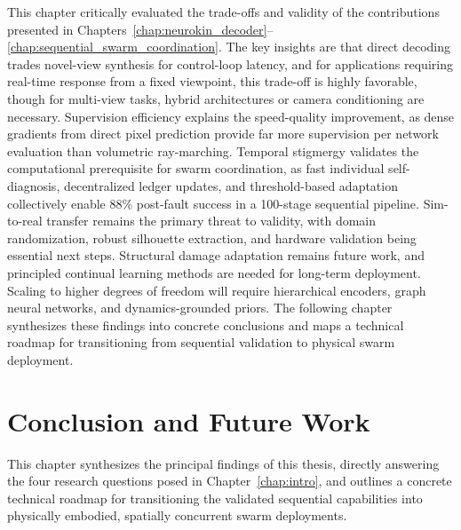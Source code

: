 \documentclass[12pt,a4paper,oneside]{report}
\begin{document}
This chapter critically evaluated the trade-offs and validity of the contributions presented in Chapters~\ref{chap:neurokin_decoder}--\ref{chap:sequential_swarm_coordination}. The key insights are that direct decoding trades novel-view synthesis for control-loop latency, and for applications requiring real-time response from a fixed viewpoint, this trade-off is highly favorable, though for multi-view tasks, hybrid architectures or camera conditioning are necessary. Supervision efficiency explains the speed-quality improvement, as dense gradients from direct pixel prediction provide far more supervision per network evaluation than volumetric ray-marching. Temporal stigmergy validates the computational prerequisite for swarm coordination, as fast individual self-diagnosis, decentralized ledger updates, and threshold-based adaptation collectively enable 88\% post-fault success in a 100-stage sequential pipeline. Sim-to-real transfer remains the primary threat to validity, with domain randomization, robust silhouette extraction, and hardware validation being essential next steps. Structural damage adaptation remains future work, and principled continual learning methods are needed for long-term deployment. Scaling to higher degrees of freedom will require hierarchical encoders, graph neural networks, and dynamics-grounded priors. The following chapter synthesizes these findings into concrete conclusions and maps a technical roadmap for transitioning from sequential validation to physical swarm deployment.





















\chapter{Conclusion and Future Work}
\label{chap:conclusion_future_work}

This chapter synthesizes the principal findings of this thesis, directly answering the four research questions posed in Chapter~\ref{chap:intro}, and outlines a concrete technical roadmap for transitioning the validated sequential capabilities into physically embodied, spatially concurrent swarm deployments.
\end{document}
